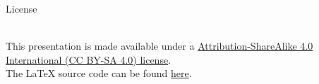 \begin{frame}[c]{License}
  \begin{center}
    \ccbysa{}\\
    \vspace{0.5cm}
    This presentation is made available under a \href{https://creativecommons.org/licenses/by-sa/4.0/}{Attribution-ShareAlike 4.0 International (CC BY-SA 4.0) license}.\\
    \vspace{1cm}
    The \LaTeX{} source code can be found \href{https://pagure.io/neuro-sig/20190909-OSB-workshop-presentation}{here}.
  \end{center}
\end{frame}

